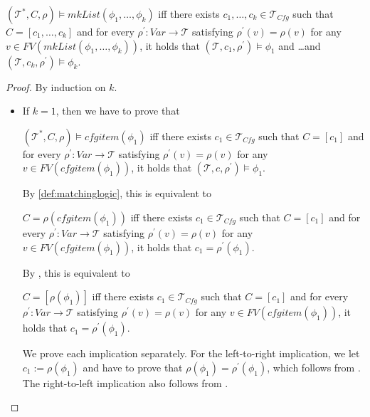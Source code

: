 \documentclass{article}
\newcommand{\Tcfg}{\mathcal{T}_{\mathit{Cfg}}}
\newenvironment{proofenv}
  {
    \VerbatimEnvironment\begin{tcolorbox}[colback=black!0!white] %
  }
  {
   \end{tcolorbox}
  }
\begin{document}
\begin{lemma}\label{lem:mkListSemantics}
$(\mathcal{T}^*, C, \rho) \vDash \mathit{mkList}(\phi_1,\ldots,\phi_k)$
iff there exists $c_1, \ldots, c_k \in \Tcfg$ such that $C = [c_1, \ldots, c_k]$ and for every $\rho^\prime : \mathit{Var} \to \mathcal{T}$ satisfying
$\rho^\prime(v) = \rho(v)$ for any \\
$v \in \mathit{FV}(\mathit{mkList}(\phi_1, \ldots, \phi_k))$,
it holds that 
$(\mathcal{T}, c_1, \rho^\prime) \vDash \phi_1$ and \ldots and $(\mathcal{T}, c_k, \rho^\prime) \vDash \phi_k$.
\end{lemma}
\begin{proof}
By induction on $k$.
\begin{itemize}
    \item If $k = 1$, then we have to prove that
    \begin{proofenv}
    $(\mathcal{T}^*, C, \rho) \vDash \mathit{cfgitem}(\phi_1)$
    iff there exists $c_1 \in \Tcfg$ such that $C = [c_1]$ and for every $\rho^\prime : \mathit{Var} \to \mathcal{T}$ satisfying
    $\rho^\prime(v) = \rho(v)$ for any $v \in \mathit{FV}(\mathit{cfgitem}(\phi_1))$, it holds that
    $(\mathcal{T}, c, \rho^\prime) \vDash \phi_1$.
    \end{proofenv}
    By \cref{def:matchinglogic}, this is equivalent to
    \begin{proofenv}
    $C = \rho(\mathit{cfgitem}(\phi_1))$
    iff there exists $c_1 \in \Tcfg$ such that $C = [c_1]$ and for every $\rho^\prime : \mathit{Var} \to \mathcal{T}$ satisfying
    $\rho^\prime(v) = \rho(v)$ for any $v \in \mathit{FV}(\mathit{cfgitem}(\phi_1))$, it holds that
    $c_1 = \rho^\prime(\phi_1)$.
    \end{proofenv}
    By , this is equivalent to
    \begin{proofenv}
    $C = [\rho(\phi_1)]$
    iff there exists $c_1 \in \Tcfg$ such that $C = [c_1]$ and for every $\rho^\prime : \mathit{Var} \to \mathcal{T}$ satisfying
    $\rho^\prime(v) = \rho(v)$ for any $v \in \mathit{FV}(\mathit{cfgitem}(\phi_1))$, it holds that
    $c_1 = \rho^\prime(\phi_1)$.
    \end{proofenv}
    We prove each implication separately.
    For the left-to-right implication, we let $c_1 := \rho(\phi_1)$
    and have to prove that $\rho(\phi_1) = \rho^\prime(\phi_1)$, which follows from .
    The right-to-left implication also follows from  .
    

\end{itemize}
\end{proof}
\end{document}
